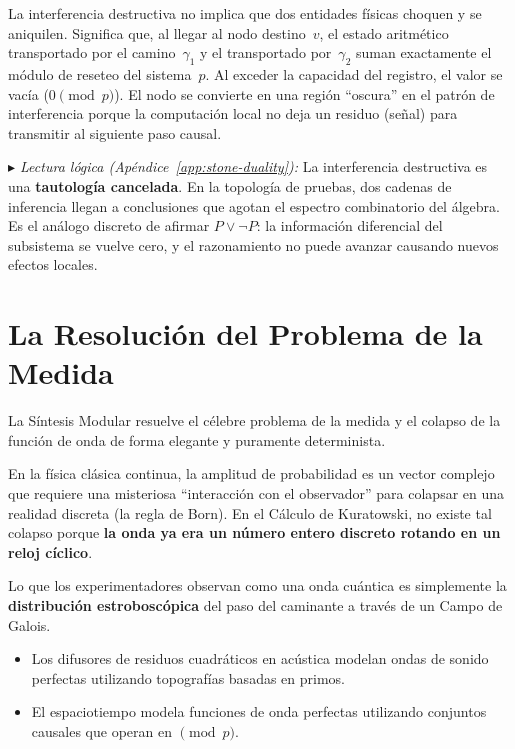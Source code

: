 \documentclass[11pt, a4paper, openany]{book}
\newcommand{\stoneref}[1]{%
  \smallskip\noindent
  {\small\color{structure!70}\textit{$\blacktriangleright$ Lectura
  l\'ogica (Ap\'endice~\ref{app:stone-duality}):} #1}%
  \smallskip}
\begin{document}
\begin{result}[title={La Naturaleza Computacional de la Onda}]
La interferencia destructiva no implica que dos entidades f\'isicas
choquen y se aniquilen. Significa que, al llegar al nodo destino~$v$, el
estado aritm\'etico transportado por el camino~$\gamma_1$ y el
transportado por~$\gamma_2$ suman exactamente el m\'odulo de reseteo del
sistema~$p$. Al exceder la capacidad del registro, el valor se
vac\'ia ($0 \pmod p$). El nodo se convierte en una regi\'on ``oscura''
en el patr\'on de interferencia porque la computaci\'on local no deja un
residuo (se\~nal) para transmitir al siguiente paso causal.
\end{result}

\stoneref{La interferencia destructiva es una \textbf{tautolog\'ia
cancelada}. En la topolog\'ia de pruebas, dos cadenas de inferencia
llegan a conclusiones que agotan el espectro combinatorio del \'algebra.
Es el an\'alogo discreto de afirmar $P \lor \neg P$: la informaci\'on
diferencial del subsistema se vuelve cero, y el razonamiento no puede
avanzar causando nuevos efectos locales.}

\section{La Resoluci\'on del Problema de la Medida}
\label{sec:measurement-problem}

La S\'intesis Modular resuelve el c\'elebre problema de la medida y el
colapso de la funci\'on de onda de forma elegante y puramente
determinista.

En la f\'isica cl\'asica continua, la amplitud de probabilidad es un
vector complejo que requiere una misteriosa ``interacci\'on con el
observador'' para colapsar en una realidad discreta (la regla de Born).
En el C\'alculo de Kuratowski, no existe tal colapso porque \textbf{la
onda ya era un n\'umero entero discreto rotando en un reloj c\'iclico}.

Lo que los experimentadores observan como una onda cu\'antica es
simplemente la \textbf{distribuci\'on estrobosc\'opica} del paso del
caminante a trav\'es de un Campo de Galois.
\begin{itemize}
  \item Los difusores de residuos cuadr\'aticos en ac\'ustica modelan
        ondas de sonido perfectas utilizando topograf\'ias basadas en
        primos.
  \item El espaciotiempo modela funciones de onda perfectas utilizando
        conjuntos causales que operan en $\pmod p$.
\end{itemize}
\end{document}
